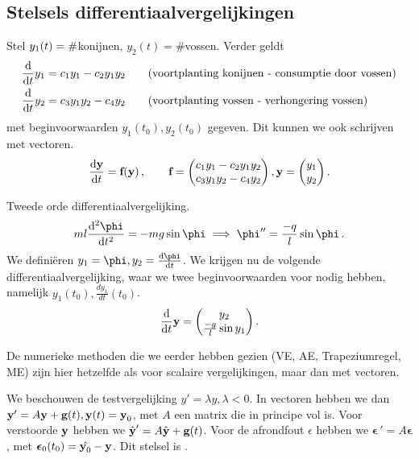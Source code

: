\documentclass{2wn20summary}
\begin{document}
			\subsection{Stelsels differentiaalvergelijkingen}
				\begin{voorbeeld}
					Stel $\linebreak y_1(t) = \#$konijnen, $ y_2(t) = \# $vossen. Verder geldt
					\begin{align*}
						\frac{\mathop{}\!\mathrm{d}}{\mathop{}\!\mathrm{d} t} y_1 &= c_1 y_1 - c_2 y_1 y_2 \qquad \text{(voortplanting konijnen - consumptie door vossen)} \\
						\frac{\mathop{}\!\mathrm{d}}{\mathop{}\!\mathrm{d} t} y_2 &= c_3 y_ 1 y_2 - c_4 y_2 \qquad \text{(voortplanting vossen - verhongering vossen)}
					\end{align*}
					met beginvoorwaarden $ y_1(t_0), y_2(t_0) $ gegeven. 
					Dit kunnen we ook schrijven met vectoren. 
					\[ 
						\frac{\mathop{}\!\mathrm{d} {\textbf{y}}}{\mathop{}\!\mathrm{d} t} = {\textbf{f}} ({\textbf{y}})\,, \qquad {\textbf{f}} = \begin{pmatrix}
						c_1 y_1 - c_2 y_1 y_2 \\ c_3 y_ 1 y_2 - c_4 y_2
						\end{pmatrix}, {\textbf{y}} = \begin{pmatrix}
							y_1 \\ y_2
						\end{pmatrix}.
					\]
				\end{voorbeeld}
				\begin{voorbeeld}
					Tweede orde differentiaalvergelijking.
					\[ 
					ml\frac{\d^2 \phi}{\d t^2} = -mg\sin \phi \implies \phi '' = \frac{-q}{l} \sin \phi \,.
					\]
					We defini\"eren $ y_1 = \phi, y_2 = \frac{\d \phi}{\d t} $. We krijgen nu de volgende differentiaalvergelijking, waar we twee beginvoorwaarden voor nodig hebben, namelijk $ y_1(t_0), \frac{d y_1}{d t}(t_0) $.
					\[ 
						\frac{\mathop{}\!\mathrm{d}}{\mathop{}\!\mathrm{d} t}{\textbf{y}} = \begin{pmatrix}
							y_2 \\ \frac{-g}{l} \sin y_1
						\end{pmatrix}.
					\]
				\end{voorbeeld}
				
				\begin{opm}
					De numerieke methoden die we eerder hebben gezien (VE, AE, Trapeziumregel, ME) zijn hier hetzelfde als voor scalaire vergelijkingen, maar dan met vectoren.
				\end{opm}
				
				We beschouwen de testvergelijking $ y'= \lambda y, \lambda < 0 $. In vectoren hebben we dan $ {\textbf{y}} ' = A {\textbf{y}} + {\textbf{g}} (t), {\textbf{y}}(t)= {\textbf{y}}_0 $, met $A$ een matrix die in principe vol is. Voor verstoorde ${\textbf{y}}$ hebben we $ \hat{{\textbf{y}}}' = A\hat{{\textbf{y}}} + {\textbf{g}}(t) $. Voor de afrondfout $\epsilon$ hebben we $ \bm{\epsilon}\,' = A\bm{\epsilon} $, met $ \bm{\epsilon}_0 (t_0) = \hat{\y_0}-\y $. Dit stelsel is .
				
\end{document}
